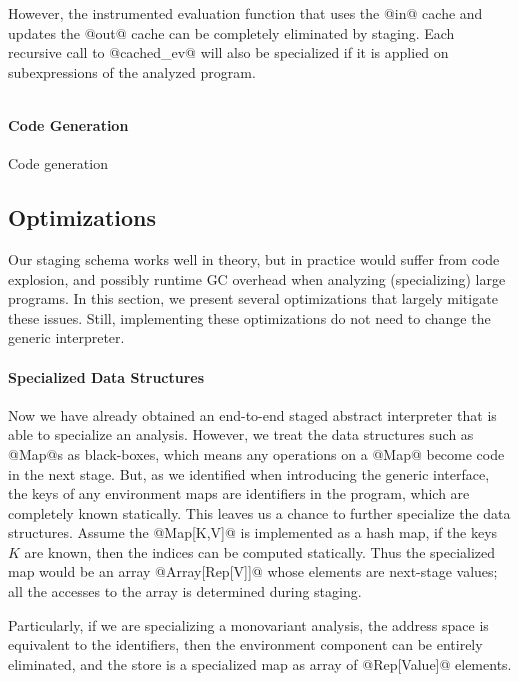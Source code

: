 However, the instrumented evaluation function that uses the @in@ cache and
updates the @out@ cache can be completely eliminated by staging. Each recursive
call to @cached_ev@ will also be specialized if it is applied on subexpressions
of the analyzed program.

\begin{lstlisting}
\end{lstlisting}

\paragraph{Code Generation} Code generation

\subsection{Optimizations} \label{staged_ds}

Our staging schema works well in theory, but in practice would suffer from code
explosion, and possibly runtime GC overhead when analyzing (specializing) large
programs. In this section, we present several optimizations that largely
mitigate these issues. Still, implementing these optimizations do not need to
change the generic interpreter.

\paragraph{Specialized Data Structures} 

Now we have already obtained an end-to-end staged abstract interpreter that is
able to specialize an analysis. However, we treat the data structures such as
@Map@s as black-boxes, which means any operations on a @Map@ become code in the
next stage. But, as we identified when introducing the generic interface, the
keys of any environment maps are identifiers in the program, which are
completely known statically. This leaves us a chance to further specialize the
data structures. Assume the @Map[K,V]@ is implemented as a hash map, if the keys
$K$ are known, then the indices can be computed statically. Thus the specialized
map would be an array @Array[Rep[V]]@ whose elements are next-stage values; all
the accesses to the array is determined during staging.

Particularly, if we are specializing a monovariant analysis, the address space
is equivalent to the identifiers, then the environment component can be entirely
eliminated, and the store is a specialized map as array of @Rep[Value]@
elements.

